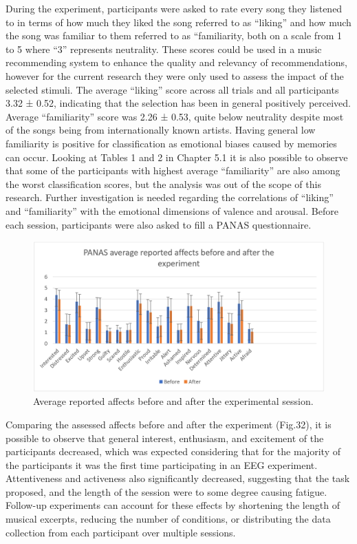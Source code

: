 During the experiment, participants were asked to rate every song they listened to in terms of how much they liked the song referred to as “liking” and how much the song was familiar to them referred to as “familiarity, both on a scale from 1 to 5 where “3” represents neutrality. These scores could be used in a music recommending system to enhance the quality and relevancy of recommendations, however for the current research they were only used to assess the impact of the selected stimuli. The average “liking” score across all trials and all participants 3.32 ± 0.52, indicating that the selection has been in general positively perceived. Average “familiarity” score was 2.26 ± 0.53, quite below neutrality despite most of the songs being from internationally known artists. Having general low familiarity is positive for classification as emotional biases caused by memories can occur. Looking at Tables 1 and 2 in Chapter 5.1 it is also possible to observe that some of the participants with highest average “familiarity” are also among the worst classification scores, but the analysis was out of the scope of this research. Further investigation is needed regarding the correlations of “liking” and “familiarity” with the emotional dimensions of valence and arousal. Before each session, participants were also asked to fill a PANAS questionnaire. 

\begin{figure}[h!]
\includegraphics[width=12cm]{img/discussion/panas.png}
\centering
\caption{Average reported affects before and after the experimental session.} \label{fig:panas}
\end{figure}
Comparing the assessed affects before and after the experiment (Fig.32), it is possible to observe that general interest, enthusiasm, and excitement of the participants decreased, which was expected considering that for the majority of the participants it was the first time participating in an EEG experiment. Attentiveness and activeness also significantly decreased, suggesting that the task proposed, and the length of the session were to some degree causing fatigue. Follow-up experiments can account for these effects by shortening the length of musical excerpts, reducing the number of conditions, or distributing the data collection from each participant over multiple sessions.


